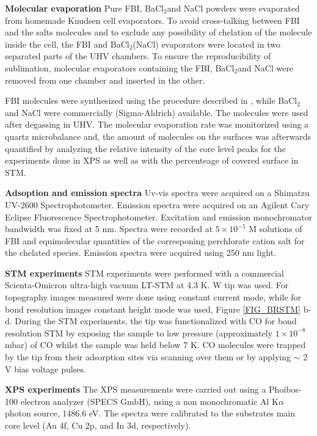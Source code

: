 \documentclass[aps,prl,reprint,longbibliography,superscriptaddress, english]{revtex4-1}
\def\BappCl{BaCl$_2$}
\begin{document}
\textbf{Molecular evaporation}
Pure FBI, \BappCl and NaCl powders were evaporated from homemade Knudsen cell evaporators. To avoid cross-talking between FBI and the salts molecules and to exclude any possibility of chelation of the molecule inside the cell, the FBI and \BappCl (NaCl) evaporators were located in two separated parts of the UHV chambers. To ensure the reproducibility of sublimation, molecular evaporators containing the FBI, \BappCl and NaCl were removed from one chamber and inserted in the other.  

FBI molecules were synthesized using the procedure described in \cite{rivilla_fluorescent_2020}, while \BappCl and NaCl were commercially (Sigma-Aldrich) available. The molecules were used after degassing in UHV.
The molecular evaporation rate was monitorized using a quartz microbalance and, the amount of molecules on the surfaces was afterwards quantified by analyzing the relative intensity of the core level peaks for the experiments done in XPS as well as with the percenteage of covered surface in STM. 

\textbf{Adsoption and emission spectra}
 Uv-vis spectra were acquired on a Shimatzu UV-2600 Spectrophotometer. Emission spectra were acquired on an Agilent Cary Eclipse Fluorescence Spectrophotometer. Excitation and emission monochromator bandwidth was fixed at 5 nm. Spectra were recorded at $5\times10^{-5}$ M solutions of FBI and equimolecular quantities of the corresponing perchlorate cation salt for the chelated species. Emission spectra were acquired using 250 nm light.

\textbf{STM experiments}
STM experiments were performed with a commercial Scienta-Omicron ultra-high vacuum LT-STM at 4.3 K. W tip  was used. For topography images measured were done using constant current mode, while for bond resolution images constant height mode was used, Figure \ref{FIG_BRSTM} b-d. During the STM experiments, the tip was functionalized with CO for bond resolution STM by exposing the sample to low pressure (approximately $1 \times 10^{-8}$ mbar) of CO whilst the sample was held below 7 K. CO molecules were trapped by the tip from their adsorption sites via scanning over them or by applying $\sim$ 2 V bias voltage pulses. 

\textbf{XPS experiments}
The XPS measurements were carried out using a Phoibos-100 electron analyzer (SPECS GmbH), using a non monochromatic Al K$\alpha$ photon source, 1486.6 eV. The spectra were calibrated to the substrates main core level (Au 4f, Cu 2p, and In 3d, respectively). 
\end{document}
